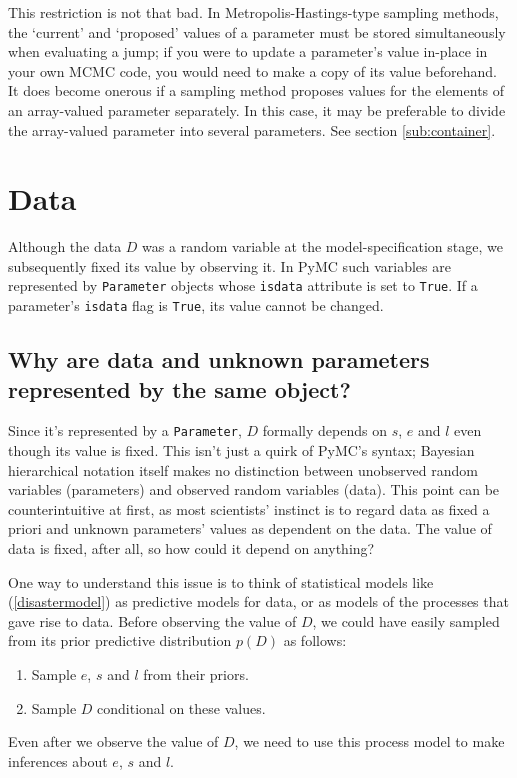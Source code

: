 This restriction is not that bad. In Metropolis-Hastings-type sampling methods, the `current' and `proposed' values of a parameter must be stored simultaneously when evaluating a jump; if you were to update a parameter's value in-place in your own MCMC code, you would need to make a copy of its value beforehand. It does become onerous if a sampling method proposes values for the elements of an array-valued parameter separately. In this case, it may be preferable to divide the array-valued parameter into several parameters. See section \ref{sub:container}. 

\section{Data}

Although the data $D$ was a random variable at the model-specification stage, we subsequently fixed its value by observing it. In PyMC such variables are represented by \texttt{Parameter} objects whose \texttt{isdata} attribute is set to \texttt{True}. If a parameter's \texttt{isdata} flag is \texttt{True}, its value cannot be changed.

\subsection{Why are data and unknown parameters represented by the same object?}
Since it's represented by a \texttt{Parameter}, $D$ formally depends on $s$, $e$ and $l$ even though its value is fixed. This isn't just a quirk of PyMC's syntax; Bayesian hierarchical notation itself makes no distinction between unobserved random variables (parameters) and observed random variables (data). This point can be counterintuitive at first, as most scientists' instinct is to regard data as fixed a priori and unknown parameters' values as dependent on the data. The value of data is fixed, after all, so how could it depend on anything?

One way to understand this issue is to think of statistical models like (\ref{disastermodel}) as predictive models for data, or as models of the processes that gave rise to data. Before observing the value of $D$, we could have easily sampled from its prior predictive distribution $p(D)$ as follows:
\begin{enumerate}
    \item Sample $e$, $s$ and $l$ from their priors.
    \item Sample $D$ conditional on these values.
\end{enumerate}
Even after we observe the value of $D$, we need to use this process model to make inferences about $e$, $s$ and $l$.

